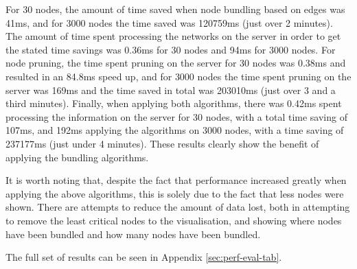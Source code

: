 \documentclass[../dissertation.tex]{subfiles}
\begin{document}
For 30 nodes, the amount of time saved when node bundling based on edges was 41ms, and for 3000 nodes the time saved was 120759ms (just over 2 minutes). The amount of time spent processing the networks on the server in order to get the stated time savings was 0.36ms for 30 nodes and 94ms for 3000 nodes. For node pruning, the time spent pruning on the server for 30 nodes was 0.38ms and resulted in an 84.8ms speed up, and for 3000 nodes the time spent pruning on the server was 169ms and the time saved in total was 203010ms (just over 3 and a third minutes). Finally, when applying both algorithms, there was 0.42ms spent processing the information on the server for 30 nodes, with a total time saving of 107ms, and 192ms applying the algorithms on 3000 nodes, with a time saving of 237177ms (just under 4 minutes). These results clearly show the benefit of applying the bundling algorithms.

It is worth noting that, despite the fact that performance increased greatly when applying the above algorithms, this is solely due to the fact that less nodes were shown. There are attempts to reduce the amount of data lost, both in attempting to remove the least critical nodes to the visualisation, and showing where nodes have been bundled and how many nodes have been bundled.

The full set of results can be seen in Appendix \ref{sec:perf-eval-tab}.
\end{document}
